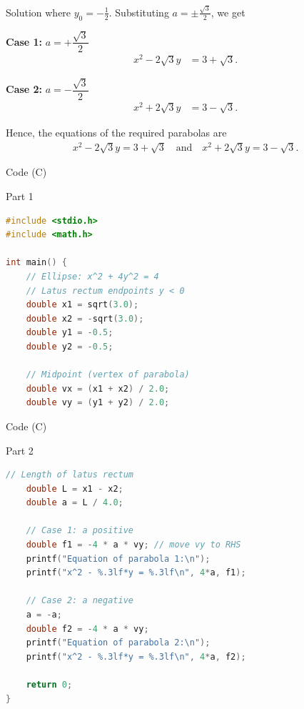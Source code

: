 \documentclass{beamer}
\begin{document}
\begin{frame}{Solution}
where $y_0 = -\frac{1}{2}$. Substituting $a =\pm\frac{\sqrt{3}}{2}$, we get


\textbf{Case 1:} $a = +\dfrac{\sqrt{3}}{2}$\\
\begin{align}
x^2 - 2\sqrt{3}y &= 3 + \sqrt{3}.
\end{align}

\textbf{Case 2:} $a = -\dfrac{\sqrt{3}}{2}$\\
\begin{align}
x^2 + 2\sqrt{3}y &= 3 - \sqrt{3}.
\end{align}

Hence, the equations of the required parabolas are
\begin{align}
\boxed{
x^2 - 2\sqrt{3}y = 3 + \sqrt{3}
\quad \text{and} \quad
x^2 + 2\sqrt{3}y = 3 - \sqrt{3}.
}
\end{align}
\end{frame}

\begin{frame}[fragile]{ Code (C)}
\begin{block}{Part 1}
\begin{lstlisting}[language=C, basicstyle=\ttfamily\small, keywordstyle=\color{blue}, frame=single]
#include <stdio.h>
#include <math.h>

int main() {
    // Ellipse: x^2 + 4y^2 = 4
    // Latus rectum endpoints y < 0
    double x1 = sqrt(3.0);
    double x2 = -sqrt(3.0);
    double y1 = -0.5;
    double y2 = -0.5;

    // Midpoint (vertex of parabola)
    double vx = (x1 + x2) / 2.0;
    double vy = (y1 + y2) / 2.0;
\end{lstlisting}
\end{block}
\end{frame}




\begin{frame}[fragile]{ Code (C)}
\begin{block}{Part 2}
\begin{lstlisting}[language=C, basicstyle=\ttfamily\small, keywordstyle=\color{blue}, frame=single]
    // Length of latus rectum
    double L = x1 - x2; 
    double a = L / 4.0; 

    // Case 1: a positive
    double f1 = -4 * a * vy; // move vy to RHS
    printf("Equation of parabola 1:\n");
    printf("x^2 - %.3lf*y = %.3lf\n", 4*a, f1);

    // Case 2: a negative
    a = -a;
    double f2 = -4 * a * vy;
    printf("Equation of parabola 2:\n");
    printf("x^2 - %.3lf*y = %.3lf\n", 4*a, f2);

    return 0;
}
\end{lstlisting}
\end{block}
\end{frame}
\end{document}
